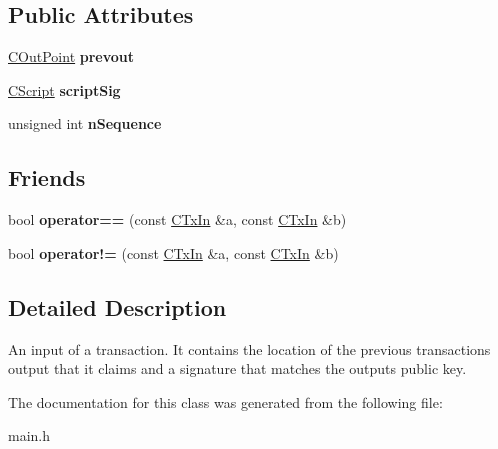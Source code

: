 \subsection*{Public Attributes}
\begin{DoxyCompactItemize}
\item 
\mbox{\label{class_c_tx_in_aed9312051a25380cbd7f123408ab7c20}} 
\mbox{\hyperlink{class_c_out_point}{C\+Out\+Point}} {\bfseries prevout}
\item 
\mbox{\label{class_c_tx_in_aba540fd902366210a6ad6cd9a18fe763}} 
\mbox{\hyperlink{class_c_script}{C\+Script}} {\bfseries script\+Sig}
\item 
\mbox{\label{class_c_tx_in_aa0dd08a6ecd0a595d9ef4dad020c1ea5}} 
unsigned int {\bfseries n\+Sequence}
\end{DoxyCompactItemize}
\subsection*{Friends}
\begin{DoxyCompactItemize}
\item 
\mbox{\label{class_c_tx_in_a1bb37c4cd8573c3014a194e8ce4d8daa}} 
bool {\bfseries operator==} (const \mbox{\hyperlink{class_c_tx_in}{C\+Tx\+In}} \&a, const \mbox{\hyperlink{class_c_tx_in}{C\+Tx\+In}} \&b)
\item 
\mbox{\label{class_c_tx_in_a4188c5f0807185c03e80598a7a3ace72}} 
bool {\bfseries operator!=} (const \mbox{\hyperlink{class_c_tx_in}{C\+Tx\+In}} \&a, const \mbox{\hyperlink{class_c_tx_in}{C\+Tx\+In}} \&b)
\end{DoxyCompactItemize}


\subsection{Detailed Description}
An input of a transaction. It contains the location of the previous transaction\textquotesingle{}s output that it claims and a signature that matches the output\textquotesingle{}s public key. 

The documentation for this class was generated from the following file\+:\begin{DoxyCompactItemize}
\item 
main.\+h\end{DoxyCompactItemize}
